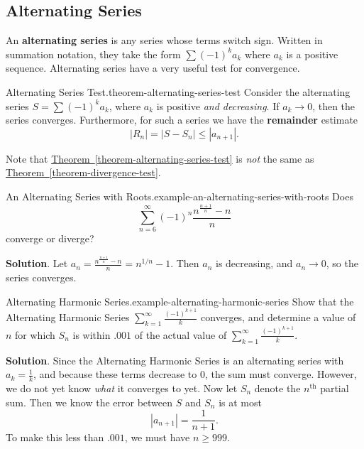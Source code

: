 \documentclass[10pt,]{book}
\newcommand{\terminology}[1]{\textbf{#1}}
\numberwithin{equation}{section}
\begin{document}
\subsection[{Alternating Series}]{Alternating Series}\label{subsection-alternating-series}
\hypertarget{p-898}{}%
An \terminology{alternating series} is any series whose terms switch sign. Written in summation notation, they take the form \(\sum (-1)^{k}a_{k}\) where \(a_{k}\) is a positive sequence. Alternating series have a very useful test for convergence.%
\begin{theorem}{Alternating Series Test.}{}{theorem-alternating-series-test}%
\hypertarget{p-899}{}%
Consider the alternating series \(S = \sum (-1)^{k}a_{k}\), where \(a_{k}\) is positive \emph{and decreasing}. If \(a_{k}\to0\), then the series converges. Furthermore, for such a series we have the \terminology{remainder} estimate%
\begin{equation*}
|R_{n}| = |S - S_{n}| \leq |a_{n+1}|\text{.}
\end{equation*}
%
\end{theorem}
\hypertarget{p-900}{}%
Note that \hyperref[theorem-alternating-series-test]{Theorem~\ref{theorem-alternating-series-test}} is \emph{not} the same as \hyperref[theorem-divergence-test]{Theorem~\ref{theorem-divergence-test}}.%
\begin{example}{An Alternating Series with Roots.}{example-an-alternating-series-with-roots}%
\hypertarget{p-901}{}%
Does%
\begin{equation*}
\sum_{n = 6}^{\infty}(-1)^{n}\frac{n^{\frac{n + 1}{n}} - n}{n}
\end{equation*}
converge or diverge?%
\par\smallskip%
\noindent\textbf{Solution}.\hypertarget{solution-185}{}\quad%
\hypertarget{p-902}{}%
Let \(a_{n} = \frac{n^{\frac{n+1}{n}} - n}{n} = n^{1/n} - 1\). Then \(a_{n}\) is decreasing, and \(a_{n}\to0\), so the series converges.%
\end{example}
\begin{example}{Alternating Harmonic Series.}{example-alternating-harmonic-series}%
\hypertarget{p-903}{}%
Show that the Alternating Harmonic Series \(\sum_{k=1}^{\infty}\frac{(-1)^{k + 1}}{k}\) converges, and determine a value of \(n\) for which \(S_{n}\) is within \(.001\) of the actual value of \(\sum_{k=1}^{\infty}\frac{(-1)^{k+1}}{k}\).%
\par\smallskip%
\noindent\textbf{Solution}.\hypertarget{solution-186}{}\quad%
\hypertarget{p-904}{}%
Since the Alternating Harmonic Series is an alternating series with \(a_{k} = \frac{1}{k}\), and because these terms decrease to \(0\), the sum must converge. However, we do not yet know \emph{what} it converges to yet. Now let \(S_{n}\) denote the \(n^{\text{th}}\) partial sum. Then we know the error between \(S\) and \(S_{n}\) is at most%
\begin{equation*}
|a_{n+1}| = \frac{1}{n + 1}\text{.}
\end{equation*}
To make this less than \(.001\), we must have \(n\geq 999\).%
\end{example}
\end{document}
